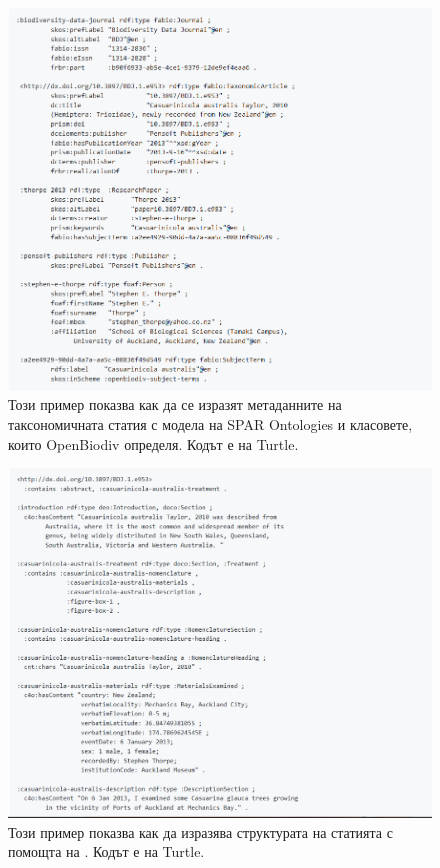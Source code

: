\begin{figure}[h!]
	\centering
	\includegraphics[width=\textwidth]{Figures/example-article-metadata}
	\decoRule
  \caption[Example article metadata.]{Този пример показва как да се изразят метаданните на таксономичната статия с модела на SPAR Ontologies и класовете, които OpenBiodiv определя. Кодът е на Turtle.}
  \label{example-article-metadata}
\end{figure}

\begin{figure}[h!]
  \centering
  \includegraphics[width=\textwidth]{Figures/example-article-structure}
  \decoRule
  \caption[Example article structure.]{Този пример показва как да изразява структурата на статията с помощта на . Кодът е на Turtle.}
  \label{example-article-structure}
\end{figure}


